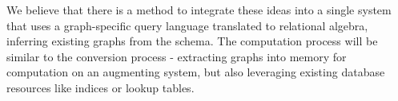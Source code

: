 \documentclass[11pt,letterpaper]{article}
\begin{document}
We believe that there is a method to integrate these ideas into a single system that uses a graph-specific query language translated to relational algebra, inferring existing graphs from the schema. The computation process will be similar to the conversion process - extracting graphs into memory for computation on an augmenting system, but also leveraging existing database resources like indices or lookup tables.





%
%
%
%
%
%
%
%
\end{document}
